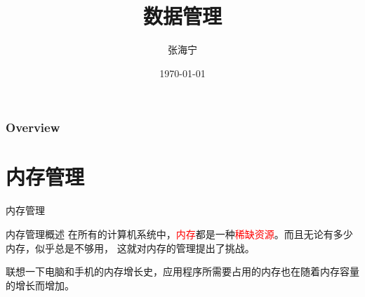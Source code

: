 \documentclass{beamer}
\title[数据管理]{数据管理} %
\author{张海宁} %
\institute[计算机科学与技术学院] %
{
贵州大学 \\ %
\medskip
\textit{hnzhang1@gzu.edu.cn} %
}
\date{\today} %
\begin{document}
\begin{frame}
\titlepage %
\end{frame}

\begin{frame}
\frametitle{Overview} %
\tableofcontents %
\end{frame}

\section{内存管理}
\begin{frame}
\Huge{\centerline{内存管理}}
\end{frame}
\begin{frame}{内存管理概述}
在所有的计算机系统中，\textcolor{red}{内存}都是一种\textcolor{red}{稀缺资源}。而且无论有多少内存，似乎总是不够用，
这就对内存的管理提出了挑战。

联想一下电脑和手机的内存增长史，应用程序所需要占用的内存也在随着内存容量的增长而增加。

\end{frame}
\end{document}
